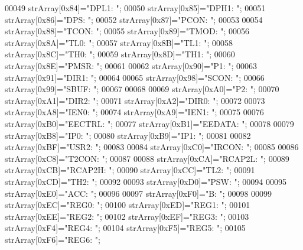 \begin{DoxyCode}
00049     strArray[0x84]=\textcolor{stringliteral}{"DPL1: "};
00050     strArray[0x85]=\textcolor{stringliteral}{"DPH1: "};
00051     strArray[0x86]=\textcolor{stringliteral}{"DPS: "};
00052     strArray[0x87]=\textcolor{stringliteral}{"PCON: "};
00053 
00054     strArray[0x88]=\textcolor{stringliteral}{"TCON: "};
00055     strArray[0x89]=\textcolor{stringliteral}{"TMOD: "};
00056     strArray[0x8A]=\textcolor{stringliteral}{"TL0: "};
00057     strArray[0x8B]=\textcolor{stringliteral}{"TL1: "};
00058     strArray[0x8C]=\textcolor{stringliteral}{"TH0: "};
00059     strArray[0x8D]=\textcolor{stringliteral}{"TH1: "};
00060     strArray[0x8E]=\textcolor{stringliteral}{"PMSR: "};
00061 
00062     strArray[0x90]=\textcolor{stringliteral}{"P1: "};
00063     strArray[0x91]=\textcolor{stringliteral}{"DIR1: "};
00064 
00065     strArray[0x98]=\textcolor{stringliteral}{"SCON: "};
00066     strArray[0x99]=\textcolor{stringliteral}{"SBUF: "};
00067 
00068 
00069     strArray[0xA0]=\textcolor{stringliteral}{"P2: "};
00070     strArray[0xA1]=\textcolor{stringliteral}{"DIR2: "};
00071     strArray[0xA2]=\textcolor{stringliteral}{"DIR0: "};
00072 
00073     strArray[0xA8]=\textcolor{stringliteral}{"IEN0: "};
00074     strArray[0xA9]=\textcolor{stringliteral}{"IEN1: "};
00075 
00076     strArray[0xB0]=\textcolor{stringliteral}{"EECTRL: "};
00077     strArray[0xB1]=\textcolor{stringliteral}{"EEDATA: "};
00078 
00079     strArray[0xB8]=\textcolor{stringliteral}{"IP0: "};
00080     strArray[0xB9]=\textcolor{stringliteral}{"IP1: "};
00081 
00082     strArray[0xBF]=\textcolor{stringliteral}{"USR2: "};
00083 
00084     strArray[0xC0]=\textcolor{stringliteral}{"IRCON: "};
00085 
00086     strArray[0xC8]=\textcolor{stringliteral}{"T2CON: "};
00087 
00088     strArray[0xCA]=\textcolor{stringliteral}{"RCAP2L: "};
00089     strArray[0xCB]=\textcolor{stringliteral}{"RCAP2H: "};
00090     strArray[0xCC]=\textcolor{stringliteral}{"TL2: "};
00091     strArray[0xCD]=\textcolor{stringliteral}{"TH2: "};
00092 
00093     strArray[0xD0]=\textcolor{stringliteral}{"PSW: "};
00094 
00095     strArray[0xE0]=\textcolor{stringliteral}{"ACC: "};
00096 
00097     strArray[0xF0]=\textcolor{stringliteral}{"B: "};
00098 
00099     strArray[0xEC]=\textcolor{stringliteral}{"REG0: "};
00100     strArray[0xED]=\textcolor{stringliteral}{"REG1: "};
00101     strArray[0xEE]=\textcolor{stringliteral}{"REG2: "};
00102     strArray[0xEF]=\textcolor{stringliteral}{"REG3: "};
00103     strArray[0xF4]=\textcolor{stringliteral}{"REG4: "};
00104     strArray[0xF5]=\textcolor{stringliteral}{"REG5: "};
00105     strArray[0xF6]=\textcolor{stringliteral}{"REG6: "};

\end{DoxyCode}
